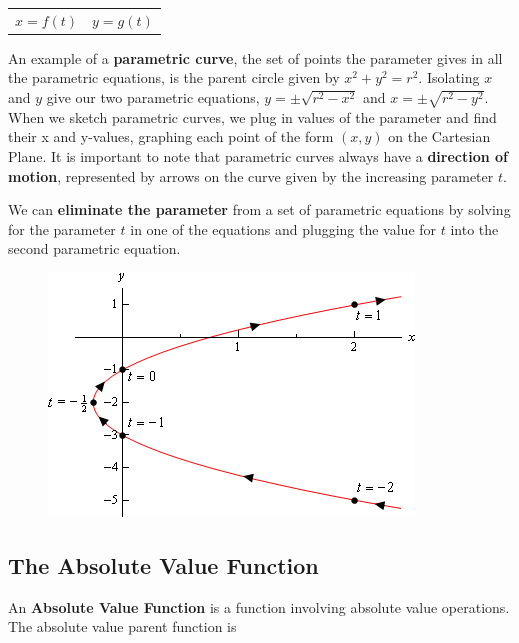 \documentclass{article}
\begin{document}
    \begin{center}
        \begin{tabular} {cc}
            $x=f(t)$ & $y=g(t)$
        \end{tabular}
    \end{center}

    \noindent An example of a \textbf{parametric curve}, the set of points the parameter gives
    in all the parametric equations, is the parent circle given by $x^2+y^2=r^2$. Isolating $x$
    and $y$ give our two parametric equations, $y=\pm\sqrt{r^2-x^2}$ and $x=\pm\sqrt{r^2-y^2}$. \\

    \noindent When we sketch parametric curves, we plug in values of the parameter and find
    their x and y-values, graphing each point of the form $(x,y)$ on the Cartesian Plane.
    It is important to note that parametric curves always have a \textbf{direction of motion},
    represented by arrows on the curve given by the increasing parameter $t$.

    \noindent We can \textbf{eliminate the parameter} from a set of parametric equations by
    solving for the parameter $t$ in one of the equations and plugging the value for $t$ into
    the second parametric equation.\\

    \begin{figure} [hbt!]
        \centering
        \includegraphics [scale = 0.5] {Resources/Unit9EvenMoreFunctions/param.png}
    \end{figure}

    \subsection{The Absolute Value Function}
    An \textbf{Absolute Value Function} is a function involving absolute value operations.
    The absolute value parent function is \\
\end{document}
